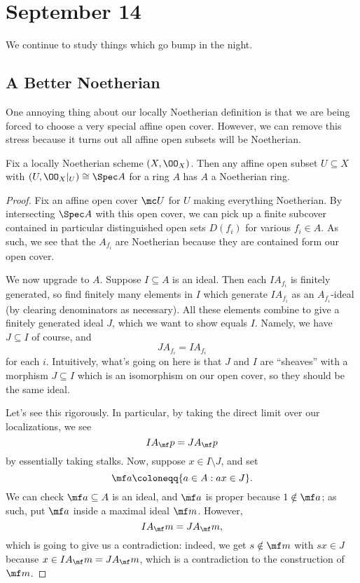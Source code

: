 \documentclass[../notes.tex]{subfiles}
\begin{document}
\section{September 14}

We continue to study things which go bump in the night.

\subsection{A Better Noetherian}
One annoying thing about our locally Noetherian definition is that we are being forced to choose a very special affine open cover. However, we can remove this stress because it turns out all affine open subsets will be Noetherian.
\begin{proposition}
	Fix a locally Noetherian scheme $(X,\OO_X)$. Then any affine open subset $U\subseteq X$ with $(U,\OO_X|_U)\cong\Spec A$ for a ring $A$ has $A$ a Noetherian ring.
\end{proposition}
\begin{proof}
	Fix an affine open cover $\mc U$ for $U$ making everything Noetherian. By intersecting $\Spec A$ with this open cover, we can pick up a finite subcover contained in particular distinguished open sets $D(f_i)$ for various $f_i\in A$. As such, we see that the $A_{f_i}$ are Noetherian because they are contained form our open cover.

	We now upgrade to $A$. Suppose $I\subseteq A$ is an ideal. Then each $IA_{f_i}$ is finitely generated, so find finitely many elements in $I$ which generate $IA_{f_i}$ as an $A_{f_i}$-ideal (by clearing denominators as necessary). All these elements combine to give a finitely generated ideal $J$, which we want to show equals $I$. Namely, we have $J\subseteq I$ of course, and
	\[JA_{f_i}=IA_{f_i}\]
	for each $i$. Intuitively, what's going on here is that $J$ and $I$ are ``sheaves'' with a morphism $J\subseteq I$ which is an isomorphism on our open cover, so they should be the same ideal.

	Let's see this rigorously. In particular, by taking the direct limit over our localizations, we see
	\[IA_\mf p=JA_\mf p\]
	by essentially taking stalks. Now, suppose $x\in I\setminus J$, and set
	\[\mf a\coloneqq\{a\in A:ax\in J\}.\]
	We can check $\mf a\subseteq A$ is an ideal, and $\mf a$ is proper because $1\notin\mf a$; as such, put $\mf a$ inside a maximal ideal $\mf m$. However,
	\[IA_\mf m=JA_\mf m,\]
	which is going to give us a contradiction: indeed, we get $s\notin\mf m$ with $sx\in J$ because $x\in IA_\mf m=JA_\mf m$, which is a contradiction to the construction of $\mf m$.
\end{proof}
\end{document}
